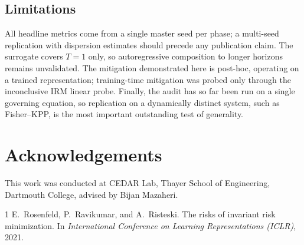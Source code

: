 \documentclass[11pt]{article}
\begin{document}
\subsection{Limitations}

All headline metrics come from a single master seed per phase; a multi-seed replication with
dispersion estimates should precede any publication claim. The surrogate covers $T = 1$ only, so
autoregressive composition to longer horizons remains unvalidated. The mitigation demonstrated here
is post-hoc, operating on a trained representation; training-time mitigation was probed only through
the inconclusive IRM linear probe. Finally, the audit has so far been run on a single governing
equation, so replication on a dynamically distinct system, such as Fisher--KPP, is the most
important outstanding test of generality.

\section*{Acknowledgements}

This work was conducted at CEDAR Lab, Thayer School of Engineering, Dartmouth College, advised by
Bijan Mazaheri.

\begin{thebibliography}{1}
E.~Rosenfeld, P.~Ravikumar, and A.~Risteski.
\newblock The risks of invariant risk minimization.
\newblock In \emph{International Conference on Learning Representations (ICLR)}, 2021.
\end{thebibliography}
\end{document}
